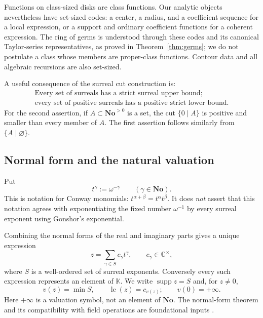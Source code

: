 \documentclass[11pt,a4paper]{article}
\numberwithin{equation}{section}
\theoremstyle{definition}
\theoremstyle{remark}
\newcommand{\No}{\mathbf{No}}
\newcommand{\K}{\mathbb K}
\newcommand{\C}{\mathbb C}
\newcommand{\supp}{\operatorname{supp}}
\newcommand{\lc}{\operatorname{lc}}
\begin{document}
Functions on class-sized disks are class functions. Our analytic objects nevertheless have set-sized codes: a center, a radius, and a coefficient sequence for a local expression, or a support and ordinary coefficient functions for a coherent expression. The ring of germs is understood through these codes and its canonical Taylor-series representatives, as proved in Theorem~\ref{thm:germs}; we do not postulate a class whose members are proper-class functions. Contour data and all algebraic recursions are also set-sized.

A useful consequence of the surreal cut construction is:
\begin{equation}
\label{eq:cut}
\begin{gathered}
\text{Every set of surreals has a strict surreal upper bound;}\\
\text{every set of positive surreals has a positive strict lower bound.}
\end{gathered}
\end{equation}
For the second assertion, if $A\subset\No^{>0}$ is a set, the cut $\{0\mid A\}$ is positive and smaller than every member of $A$. The first assertion follows similarly from $\{A\mid\varnothing\}$.

\subsection{Normal form and the natural valuation}
Put
\[
 t^\gamma:=\omega^{-\gamma}\qquad(\gamma\in\No).
\]
This is notation for Conway monomials: $t^{\alpha+\beta}=t^\alpha t^\beta$. It does \emph{not} assert that this notation agrees with exponentiating the fixed number $\omega^{-1}$ by every surreal exponent using Gonshor's exponential.

Combining the normal forms of the real and imaginary parts gives a unique expression
\begin{equation}
\label{eq:normal}
 z=\sum_{\gamma\in S}c_\gamma t^\gamma,
 \qquad c_\gamma\in\C^\times,
\end{equation}
where $S$ is a well-ordered set of surreal exponents. Conversely every such expression represents an element of $\K$. We write $\supp z=S$ and, for $z\ne0$,
\[
 v(z)=\min S,\qquad \lc(z)=c_{v(z)};
 \qquad v(0)=+\infty.
\]
Here $+\infty$ is a valuation symbol, not an element of $\No$. The normal-form theorem and its compatibility with field operations are foundational inputs \cite{Conway,Gonshor,BMderiv}.
\end{document}
